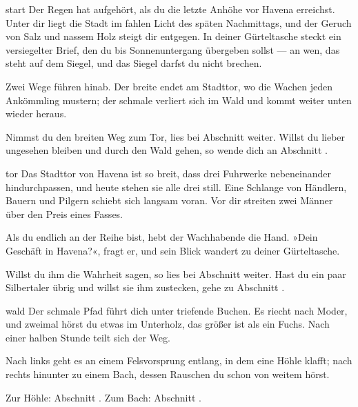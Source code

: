 
\begin{soloBlock}{start}
Der Regen hat aufgehört, als du die letzte Anhöhe vor Havena erreichst. Unter dir
liegt die Stadt im fahlen Licht des späten Nachmittags, und der Geruch von Salz und
nassem Holz steigt dir entgegen. In deiner Gürteltasche steckt ein versiegelter
Brief, den du bis Sonnenuntergang übergeben sollst — an wen, das steht auf dem
Siegel, und das Siegel darfst du nicht brechen.

Zwei Wege führen hinab. Der breite endet am Stadttor, wo die Wachen jeden Ankömmling
mustern; der schmale verliert sich im Wald und kommt weiter unten wieder heraus.

Nimmst du den breiten Weg zum Tor, lies bei Abschnitt  weiter.
Willst du lieber ungesehen bleiben und durch den Wald gehen, so wende dich an
Abschnitt .
\end{soloBlock}

\begin{soloBlock}{tor}
Das Stadttor von Havena ist so breit, dass drei Fuhrwerke nebeneinander hindurchpassen,
und heute stehen sie alle drei still. Eine Schlange von Händlern, Bauern und Pilgern
schiebt sich langsam voran. Vor dir streiten zwei Männer über den Preis eines Fasses.

Als du endlich an der Reihe bist, hebt der Wachhabende die Hand. »Dein Geschäft in
Havena?«, fragt er, und sein Blick wandert zu deiner Gürteltasche.

Willst du ihm die Wahrheit sagen, so lies bei Abschnitt  weiter.
Hast du ein paar Silbertaler übrig und willst sie ihm zustecken, gehe zu Abschnitt
.
\end{soloBlock}

\begin{soloBlock}{wald}
Der schmale Pfad führt dich unter triefende Buchen. Es riecht nach Moder, und zweimal
hörst du etwas im Unterholz, das größer ist als ein Fuchs. Nach einer halben Stunde
teilt sich der Weg.

Nach links geht es an einem Felsvorsprung entlang, in dem eine Höhle klafft; nach
rechts hinunter zu einem Bach, dessen Rauschen du schon von weitem hörst.

Zur Höhle: Abschnitt . Zum Bach: Abschnitt .
\end{soloBlock}

